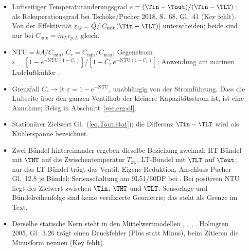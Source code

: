 \begin{itemize}
  \item Luftseitiger Temperaturänderungsgrad
    $\varepsilon = (\Tin - \Tout)/(\Tin - \TLT)$
    \cite[S.~257, Gl.~12.8]{pucherLadeluftkuehlungUndLadeluftkuehler2012}; als
    Rekuperationsgrad bei Tschöke/Pucher 2018, S.~68, Gl.~41 (Key fehlt). Von der
    Effektivität $\varepsilon_Q = \dot Q/[C_{\min}(\Tin - \TLT)]$ unterscheiden;
    beide sind nur bei $C_{\min} = \dot m_L c_{p,L}$ gleich.
  \item $\mathrm{NTU} = kA/C_{\min}$, $C_r = C_{\min}/C_{\max}$; Gegenstrom
    $\varepsilon = [1 - e^{-\mathrm{NTU}(1-C_r)}]/[1 - C_r\,e^{-\mathrm{NTU}(1-C_r)}]$;
    Anwendung am marinen Ladeluftkühler
    \cite[Anhang~B.2, S.~25, Gl.~B.6--B.8]{suiMeanValueFirst2022}.
  \item Grenzfall $C_r \to 0$: $\varepsilon = 1 - e^{-\mathrm{NTU}}$, unabhängig
    von der Stromführung. Dass die Luftseite über den ganzen Ventilhub der
    kleinere Kapazitätsstrom ist, ist eine Annahme; Beleg in
    Abschnitt~\ref{sec.erg.ol}.
  \item Stationärer Zielwert Gl.~(\ref{eq.Tout.stat}); die Differenz
    $\Tin - \TLT$ wird als Kühlerspanne bezeichnet.
  \item Zwei Bündel hintereinander ergeben dieselbe Beziehung zweimal: HT-Bündel
    mit $\THT$ auf die Zwischentemperatur $T_{\mathrm{zw}}$, LT-Bündel mit
    $\TLT$ auf $\Tout$; nur das LT-Bündel trägt das Ventil. Eigene Reduktion,
    Anschluss Pucher Gl.~12.8 je Bündel; Serienschaltung am 9L51/60DF bei
    \cite[S.~89--90, Gl.~47]{rupprechtAnalysisSimulationOptimisation2016}. Bei
    positiven NTU liegt der Zielwert zwischen $\Tin$, $\THT$ und $\TLT$.
    Sensorlage und Bündelreihenfolge sind keine verifizierte Geometrie; das
    steht als Grenze im Text.
  \item Derselbe statische Kern steht in den Mittelwertmodellen
    \cite[S.~204, Gl.~7.69]{erikssonModelingControlEngines2014},
    \cite[S.~197, Gl.~23]{theotokatosCycleMeanValue2010},
    \cite[S.~405, Gl.~6]{baldiDevelopmentCombinedMean2015},
    \cite[S.~571, Gl.~8]{mrosekParameterEstimationPhysical2009}. Holmgren 2005,
    Gl.~3.26 trägt einen Druckfehler (Plus statt Minus), beim Zitieren die
    Minusform nennen (Key fehlt).
\end{itemize}

